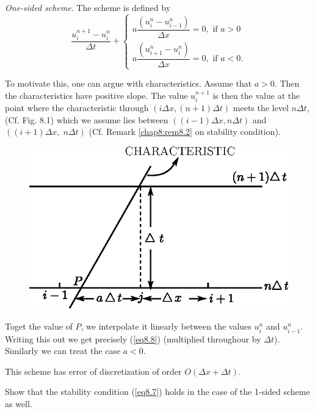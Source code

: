 \begin{exam}\label{chap8:exam8.3}
{\em One-sided scheme}. The scheme is defined by
\begin{equation*}
\frac{u^{n+1}_i - u^n_i}{\Delta t} + 
\begin{cases}
a \dfrac{(u^n_i - u^n_{i-1})}{\Delta x} = 0, \text{ if } a > 0\\
a \dfrac{(u^n_{i+1} - u^n_i)}{\Delta x} = 0, \text{ if } a < 0.
\end{cases}\tag{8.8}\label{eq8.8}
\end{equation*}

To motivate this, one can argue with characteristics. Assume that
$a>0$. Then the characteristics have positive slope. The value
$u^{n+1}_i$ is then the value at the point where the characteristic
through $(i\Delta x, (n+1)\Delta t) $ meets the level $n\Delta t$,
(Cf. Fig. 8.1) which we assume lies between $((i-1)\Delta x, n \Delta
t)$ and $((i+1) \Delta x, \; n \Delta t)$
(Cf. Remark \ref{chap8:rem8.2} on stability condition).  

\begin{figure}[H]
\centering
\includegraphics{figures/fig52-8.1.eps}
\caption{}\label{c8:fig8.1}
\end{figure}

To\pageoriginale get the value of $P$, we interpolate it linearly between the values $u^n_i$ and $u^n_{i-1}$. Writing this out we get precisely (\ref{eq8.8}) (multiplied throughour by $\Delta t$). Similarly we can treat the case $a < 0$.

This scheme has error of discretization of order $O(\Delta x + \Delta t)$. 
\end{exam}

\begin{exercise}\label{chap8:exer8.1}
Show that the stability condition (\ref{eq8.7}) holds in the case of the 1-sided scheme as well.
\end{exercise}

